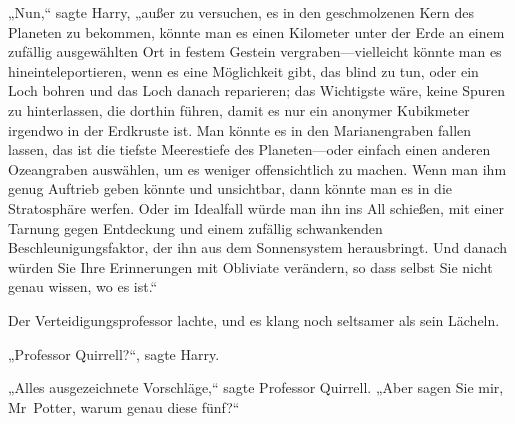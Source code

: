 „Nun,“ sagte Harry, „außer zu versuchen, es in den geschmolzenen Kern des Planeten zu bekommen, könnte man es einen Kilometer unter der Erde an einem zufällig ausgewählten Ort in festem Gestein vergraben—vielleicht könnte man es hineinteleportieren, wenn es eine Möglichkeit gibt, das blind zu tun, oder ein Loch bohren und das Loch danach reparieren; das Wichtigste wäre, keine Spuren zu hinterlassen, die dorthin führen, damit es nur ein anonymer Kubikmeter irgendwo in der Erdkruste ist. Man könnte es in den Marianengraben fallen lassen, das ist die tiefste Meerestiefe des Planeten—oder einfach einen anderen Ozeangraben auswählen, um es weniger offensichtlich zu machen. Wenn man ihm genug Auftrieb geben könnte und unsichtbar, dann könnte man es in die Stratosphäre werfen. Oder im Idealfall würde man ihn ins All schießen, mit einer Tarnung gegen Entdeckung und einem zufällig schwankenden Beschleunigungsfaktor, der ihn aus dem Sonnensystem herausbringt. Und danach würden Sie Ihre Erinnerungen mit Obliviate verändern, so dass selbst Sie nicht genau wissen, wo es ist.“

Der Verteidigungsprofessor lachte, und es klang noch seltsamer als sein Lächeln.

„Professor Quirrell?“, sagte Harry.

„Alles ausgezeichnete Vorschläge,“ sagte Professor Quirrell. „Aber sagen Sie mir, Mr~Potter, warum genau diese fünf?“

